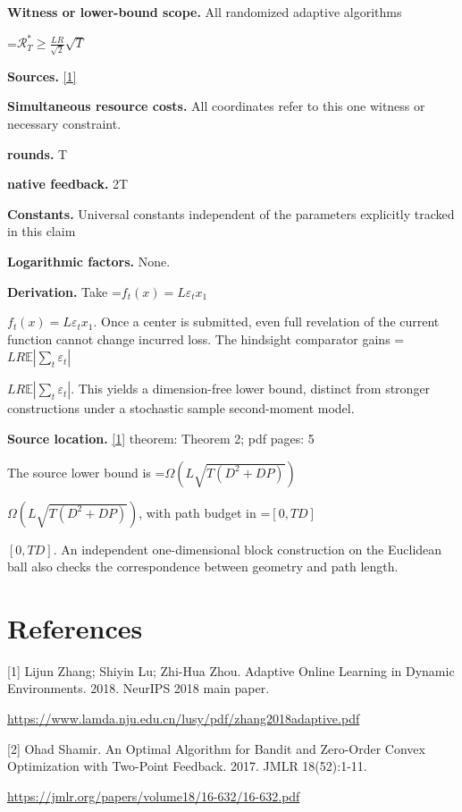 \documentclass[10pt,a4paper]{article}
\newcommand{\AtlasMath}[1]{\par\begingroup\centering\setbox0=\hbox{$\displaystyle #1$}\ifdim\wd0>1.4\linewidth\typeout{ATLAS WIDE FORMULA: \the\wd0}\fi\ifdim\wd0>\linewidth\resizebox{\linewidth}{!}{\box0}\else\box0\fi\par\endgroup}
\newcommand{\AtlasInlineMath}[1]{\begingroup\setbox0=\hbox{$#1$}\ifdim\wd0>.4\linewidth\endgroup\AtlasMath{#1}\else\endgroup$#1$\fi}
\begin{document}
\textbf{Witness or lower-bound scope.} All randomized adaptive algorithms

\AtlasMath{\mathcal{R}_T^*\ge\frac{LR}{\sqrt2}\sqrt T}
\textbf{Sources.} \href{https://www.lamda.nju.edu.cn/lusy/pdf/zhang2018adaptive.pdf}{[1]}

\textbf{Simultaneous resource costs.} All coordinates refer to this one witness or necessary constraint.

\textbf{rounds.} T

\textbf{native feedback.} 2T

\textbf{Constants.} Universal constants independent of the parameters explicitly tracked in this claim

\textbf{Logarithmic factors.} None.

\textbf{Derivation.} Take \AtlasInlineMath{f_t(x)=L\varepsilon_t x_1}. Once a center is submitted, even full revelation of the current function cannot change incurred loss. The hindsight comparator gains \AtlasInlineMath{LR\mathbb E|\sum_t\varepsilon_t|}. This yields a dimension-free lower bound, distinct from stronger constructions under a stochastic sample second-moment model.

\textbf{Source location.} \href{https://www.lamda.nju.edu.cn/lusy/pdf/zhang2018adaptive.pdf}{[1]} theorem: Theorem 2; pdf pages: 5

The source lower bound is \AtlasInlineMath{\Omega(L\sqrt{T(D^2+DP)})}, with path budget in \AtlasInlineMath{[0,TD]}. An independent one-dimensional block construction on the Euclidean ball also checks the correspondence between geometry and path length.

\section{References}
[1] Lijun Zhang; Shiyin Lu; Zhi-Hua Zhou. Adaptive Online Learning in Dynamic Environments. 2018. NeurIPS 2018 main paper.

\url{https://www.lamda.nju.edu.cn/lusy/pdf/zhang2018adaptive.pdf}

[2] Ohad Shamir. An Optimal Algorithm for Bandit and Zero-Order Convex Optimization with Two-Point Feedback. 2017. JMLR 18(52):1-11.

\url{https://jmlr.org/papers/volume18/16-632/16-632.pdf}
\end{document}
